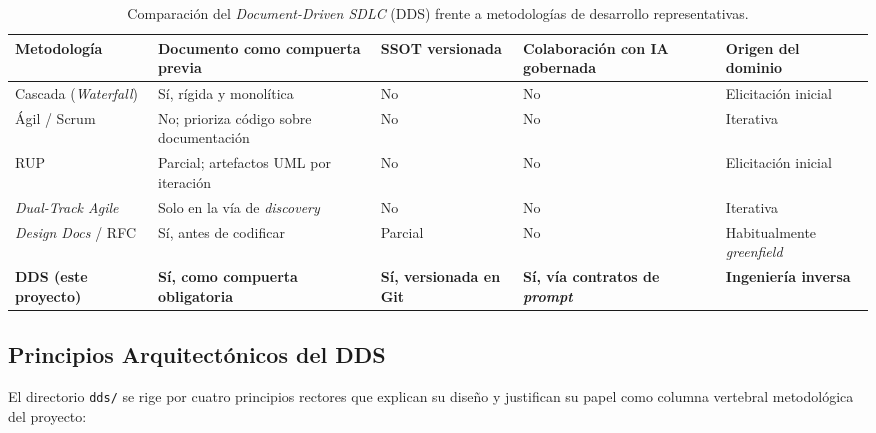 \begin{table}[htbp]
    \centering
    \caption{Comparación del \textit{Document-Driven SDLC} (DDS) frente a metodologías de desarrollo representativas.}
    \label{tab:dds_comparativa}
    \footnotesize
    \begin{tabularx}{\textwidth}{@{}l X X X X@{}}
        \toprule
        \textbf{Metodología} & \textbf{Documento como compuerta previa} & \textbf{SSOT versionada} & \textbf{Colaboración con IA gobernada} & \textbf{Origen del dominio} \\
        \midrule
        Cascada (\textit{Waterfall}) & Sí, rígida y monolítica & No & No & Elicitación inicial \\
        Ágil / Scrum & No; prioriza código sobre documentación & No & No & Iterativa \\
        RUP & Parcial; artefactos UML por iteración & No & No & Elicitación inicial \\
        \textit{Dual-Track Agile} & Solo en la vía de \textit{discovery} & No & No & Iterativa \\
        \textit{Design Docs} / RFC & Sí, antes de codificar & Parcial & No & Habitualmente \textit{greenfield} \\
        \textbf{DDS (este proyecto)} & \textbf{Sí, como compuerta obligatoria} & \textbf{Sí, versionada en Git} & \textbf{Sí, vía contratos de \textit{prompt}} & \textbf{Ingeniería inversa} \\
        \bottomrule
    \end{tabularx}
\end{table}

\subsection{Principios Arquitectónicos del DDS}
\label{subsec:dds_principios}

El directorio \texttt{dds/} se rige por cuatro principios rectores que explican su
diseño y justifican su papel como columna vertebral metodológica del proyecto:

